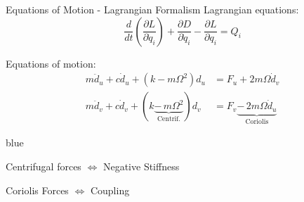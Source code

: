 \documentclass[t, minted]{clean-beamer}
\begin{document}
\begin{frame}[label={sec:org614e76f}]{Equations of Motion - Lagrangian Formalism}
Lagrangian equations:
\begin{equation*}
  \frac{d}{dt} \left( \frac{\partial L}{\partial \dot{q}_i} \right) + \frac{\partial D}{\partial \dot{q}_i} - \frac{\partial L}{\partial q_i} = Q_i
\end{equation*}

\vspace{1em}

Equations of motion:
\begin{align*}
  m \ddot{d}_u + c \dot{d}_u + ( k - m \Omega^2 ) d_u &= F_u + 2 m \Omega \dot{d}_v \\
  m \ddot{d}_v + c \dot{d}_v + ( k \underbrace{-\,m \Omega^2}_{\text{Centrif.}} ) d_v &= F_v \underbrace{-\,2 m \Omega \dot{d}_u}_{\text{Coriolis}}
\end{align*}

\vspace{1em}

\begin{cbox}[]{blue}{}
\begin{center}
Centrifugal forces \(\Longleftrightarrow\) Negative Stiffness

Coriolis Forces \(\Longleftrightarrow\) Coupling
\end{center}
\end{cbox}
\end{frame}
\end{document}
